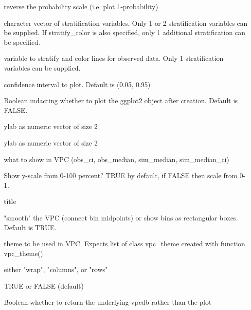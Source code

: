 \documentclass[letterpaper]{book}
\begin{document}
\begin{Arguments}
\begin{ldescription}
\item[\code{reverse\_prob}] reverse the probability scale (i.e. plot 1-probability)

\item[\code{stratify}] character vector of stratification variables. Only 1 or 2 stratification variables can be supplied. If stratify\_color is also specified, only 1 additional stratification can be specified.

\item[\code{stratify\_color}] variable to stratify and color lines for observed data. Only 1 stratification variables can be supplied.

\item[\code{ci}] confidence interval to plot. Default is (0.05, 0.95)

\item[\code{plot}] Boolean indacting whether to plot the ggplot2 object after creation. Default is FALSE.

\item[\code{xlab}] ylab as numeric vector of size 2

\item[\code{ylab}] ylab as numeric vector of size 2

\item[\code{show}] what to show in VPC (obs\_ci, obs\_median, sim\_median, sim\_median\_ci)

\item[\code{as\_percentage}] Show y-scale from 0-100 percent? TRUE by default, if FALSE then scale from 0-1.

\item[\code{title}] title

\item[\code{smooth}] "smooth" the VPC (connect bin midpoints) or show bins as rectangular boxes. Default is TRUE.

\item[\code{vpc\_theme}] theme to be used in VPC. Expects list of class vpc\_theme created with function vpc\_theme()

\item[\code{facet}] either "wrap", "columns", or "rows"

\item[\code{verbose}] TRUE or FALSE (default)

\item[\code{vpcdb}] Boolean whether to return the underlying vpcdb rather than the plot
\end{ldescription}
\end{Arguments}
\end{document}
